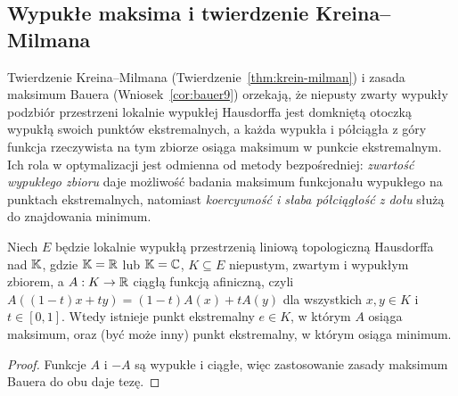 \subsection{Wypukłe maksima i twierdzenie Kreina--Milmana}

Twierdzenie Kreina--Milmana (Twierdzenie~\ref{thm:krein-milman})
i zasada maksimum Bauera (Wniosek~\ref{cor:bauer9}) orzekają,
że niepusty zwarty wypukły podzbiór przestrzeni lokalnie wypukłej
Hausdorffa jest domkniętą otoczką wypukłą swoich punktów
ekstremalnych, a każda wypukła i półciągła z góry funkcja
rzeczywista na tym zbiorze osiąga maksimum w punkcie ekstremalnym. Ich rola w optymalizacji jest odmienna od metody bezpośredniej:
\emph{zwartość wypukłego zbioru} daje możliwość badania maksimum
funkcjonału wypukłego na punktach ekstremalnych,
natomiast \emph{koercywność i słaba półciągłość z dołu}
służą do znajdowania minimum.

\begin{stwierdzenie}
\label{prop:affine-extreme16}
Niech $E$ będzie lokalnie wypukłą przestrzenią liniową
topologiczną Hausdorffa nad $\mathbb K$, gdzie $\mathbb K=\mathbb R$ lub $\mathbb K=\mathbb C$,
$K\subseteq E$ niepustym, zwartym i wypukłym zbiorem,
a $A:K\to\mathbb R$ ciągłą funkcją afiniczną,
czyli $A((1-t)x+ty)=(1-t)A(x)+tA(y)$
dla wszystkich $x,y\in K$ i $t\in[0,1]$.
Wtedy istnieje punkt ekstremalny $e\in K$, w którym
$A$ osiąga maksimum, oraz (być może inny) punkt ekstremalny,
w którym osiąga minimum.
\end{stwierdzenie}
\begin{proof}
Funkcje $A$ i $-A$ są wypukłe i ciągłe,
więc zastosowanie zasady maksimum Bauera do obu daje tezę.
\end{proof}


